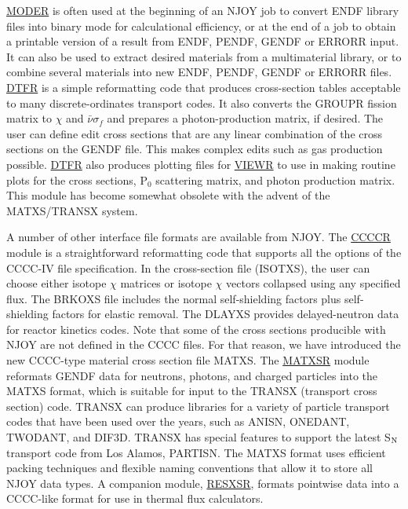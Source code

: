 \hyperlink{sMODERhy}{MODER} is
often used at the beginning of an NJOY job
to convert ENDF library files into binary mode for calculational
efficiency, or at the end of a job to obtain a printable version
of a result from ENDF, PENDF, GENDF or ERRORR input.  It can also
be used to extract desired materials from a multimaterial library, or to
combine several materials into new ENDF, PENDF, GENDF or
ERRORR files.
\hyperlink{sDTFRhy}{DTFR}  is
a simple reformatting code that produces
cross-section tables acceptable to many discrete-ordinates transport
codes.  It also converts the
GROUPR fission matrix to $\chi$ and $\bar{\nu}\sigma_f$ and prepares
a photon-production matrix, if desired.  The user can define
edit cross sections that are any linear combination of the
cross sections on the GENDF file.  This makes complex edits
such as gas production possible.  \hyperlink{sDTFRhy}{DTFR}
also produces plotting files for \hyperlink{sVIEWRhy}{VIEWR}
to use in making routine plots for the
cross sections, P$_0$ scattering matrix, and photon production
matrix.  This module has become somewhat obsolete with the advent
of the MATXS/TRANSX system.

A number of other interface file formats are available from
NJOY.  The \hyperlink{sCCCCRhy}{CCCCR}
module is a straightforward
reformatting code that supports all the options of the
CCCC-IV\cite{CCCC4} file specification.  In the
cross-section file (ISOTXS), the user can choose
either isotope $\chi$ matrices or isotope $\chi$ vectors collapsed
using any specified flux.  The BRKOXS file includes
the normal self-shielding factors plus self-shielding factors for
elastic removal.  The DLAYXS provides delayed-neutron
data for reactor kinetics codes.  Note that some of the
cross sections producible with NJOY are not defined in the CCCC
files.  For that reason, we have introduced the new CCCC-type
material cross section file MATXS.  The
\hyperlink{sMATXSRhy}{MATXSR}
 module reformats GENDF data for neutrons, photons,
and charged particles into the MATXS format, which is suitable
for input to the TRANSX (transport cross section)
code\cite{TRANSX}.  TRANSX can produce libraries
for a variety of particle transport codes that have been
used over the years, such as ANISN\cite{ANISN},
ONEDANT\cite{ONEDANT},
TWODANT\cite{TWODANT}, and
DIF3D\cite{DIF3D}.  TRANSX has special features
to support the latest S$_{\rm N}$ transport code from Los Alamos,
PARTISN\cite{PARTISN}.  The MATXS format uses
efficient packing techniques and flexible naming conventions
that allow it to store all NJOY data types.  A companion module,
\hyperlink{sRESXSRhy}{RESXSR}, formats  pointwise data into
a CCCC-like format for use in thermal flux calculators.

